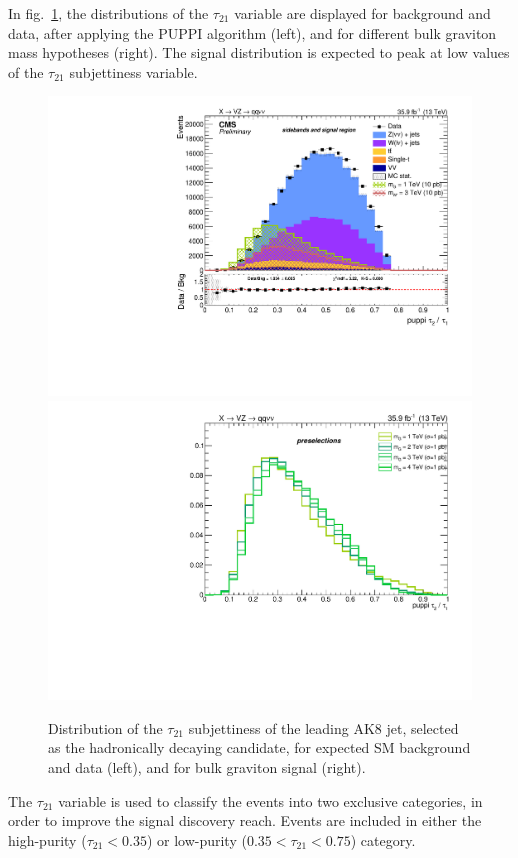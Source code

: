\noindent In fig.~\ref{fig:fatjet_pre_tau21}, the distributions of the $\tau_{21}$ variable are displayed for background and data, after applying the PUPPI algorithm (left), and for different bulk graviton mass hypotheses (right). The signal distribution is expected to peak at low values of the $\tau_{21}$ subjettiness variable.

\begin{figure}[!htb]
  \begin{center}
    \includegraphics[width=.495\textwidth]{figures/FatJet1_puppiTau21.pdf}%
    \includegraphics[width=.495\textwidth]{plots/v9_thesis/XVZnnPre/FatJet1_puppiTau21_signalZZ.pdf}
  \end{center}
  \caption{Distribution of the $\tau_{21}$ subjettiness of the leading AK8 jet, selected as the hadronically decaying \V candidate, for expected SM background and data (left), and for bulk graviton signal (right).}
  \label{fig:fatjet_pre_tau21}
\end{figure}

\vspace*{1\baselineskip}

\noindent The $\tau_{21}$ variable is used to classify the events into two exclusive categories, in order to improve the signal discovery reach. Events are included in either the high-purity ($\tau_{21} < 0.35$) or low-purity ($0.35 < \tau_{21} < 0.75$) category.


